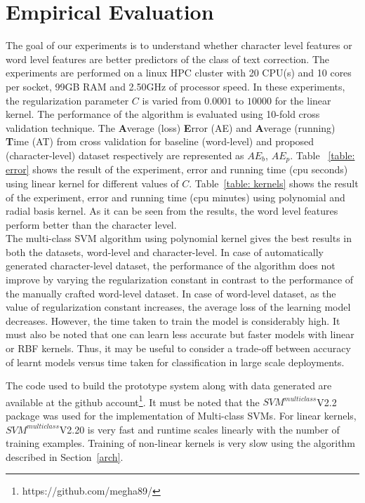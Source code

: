 \documentclass{sig-alternate}
\begin{document}
\section{Empirical Evaluation}
\label{sec:evaluation}
The goal of our experiments is to understand whether character level features or word level features are better predictors of the class of text correction.
The experiments are performed on a linux HPC cluster with 20 CPU(s) and 10 cores per socket, 99GB RAM and 2.50GHz of processor speed. In these experiments, the regularization parameter $C$ is varied from $0.0001$ to $10000$ for the linear kernel. The performance of the algorithm is evaluated using 10-fold cross validation technique. The \textbf{A}verage (loss) \textbf{E}rror (AE) and  \textbf{A}verage (running) \textbf{T}ime (AT) from cross validation for baseline (word-level) and proposed (character-level) dataset respectively are represented as $AE_{b}$, $AE_{p}$. Table ~\ref{table: error} shows the result of the experiment, error and running time (cpu seconds) using linear kernel for different values of $C$. Table~\ref{table: kernels} shows the result of the experiment, error and running time (cpu minutes) using polynomial and radial basis kernel. As it can be seen from the results, the word level features perform better than the character level.\\
The multi-class SVM algorithm using polynomial kernel gives the best results in both the datasets, word-level and character-level. In case of automatically generated character-level dataset, the performance of the algorithm does not improve by varying the regularization constant in contrast to the performance of the manually crafted word-level dataset. In case of word-level dataset, as the value of regularization constant increases, the average loss of the learning model decreases. However, the time taken to train the model is considerably high. It must also be noted that one can learn less accurate but faster models with linear or RBF kernels. Thus, it may be useful to consider a trade-off between accuracy of learnt models versus time taken for classification in large scale deployments.
 
The code used to build the prototype system along with data generated are available at the github account\footnote{https://github.com/megha89/}. It must be noted that the $SVM^{multiclass}$V2.2 package \cite{algo} was used for the implementation of Multi-class SVMs. 
For linear kernels, $SVM^{multiclass}$V2.20 is very fast and runtime scales linearly with the number of training examples. Training of non-linear kernels is very slow using the algorithm described in Section~\ref{arch}.
\end{document}
